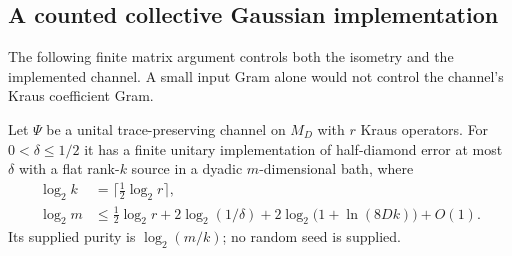 \subsection{A counted collective Gaussian implementation}

The following finite matrix argument controls both the isometry and
the implemented channel. A small input Gram alone would not control
the channel's Kraus coefficient Gram.

\begin{lemma}\label{lem:collective-gaussian}
Let $\Psi$ be a unital trace-preserving channel on $M_D$ with $r$
Kraus operators. For $0<\delta\leq1/2$ it has a finite unitary
implementation of half-diamond error at most $\delta$ with a flat
rank-$k$ source in a dyadic $m$-dimensional bath, where
\begin{align*}
 \log_2 k&=\lceil\tfrac12\log_2r\rceil,\\
 \log_2m&\leq\tfrac12\log_2r+2\log_2(1/\delta)
       +2\log_2\bigl(1+\ln(8Dk)\bigr)+O(1).
\end{align*}
Its supplied purity is $\log_2(m/k)$; no random seed is supplied.
\end{lemma}
